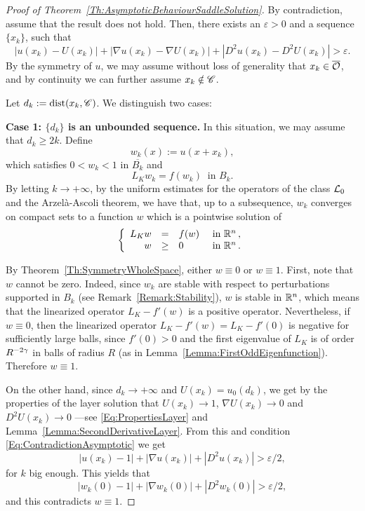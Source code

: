 \begin{proof}[Proof of Theorem~\ref{Th:AsymptoticBehaviourSaddleSolution}]
By contradiction, assume that the result does not hold. Then, there exists an $\varepsilon>0$ and a sequence $\{x_k\}$, such that
\begin{equation}
\label{Eq:ContradictionAsymptotic}
|u(x_k)-U(x_k)|+|\nabla u(x_k)-\nabla U(x_k)|+|D^2u(x_k)-D^2U(x_k)| > \varepsilon.
\end{equation}
By the symmetry of $u$, we may assume without loss of generality that $x_k \in \overline{\mathcal{O}}$, and by continuity we can further assume $ x_k \notin \mathscr{C}$. 

Let $d_k:=\operatorname{dist}(x_k,\mathscr{C})$. We distinguish two cases:

\textbf{Case 1: $\{d_k\}$ is an unbounded sequence.} In this situation, we may assume that $d_k \geq 2k$. Define
$$
w_k(x) := u(x+x_k), 
$$
which satisfies $0<w_k<1$ in $\overline{B_k}$ and
$$
L_K w_k = f(w_k) \ \textrm{ in } B_k.
$$
By letting $k\to +\infty$, by the uniform estimates for the operators of the class $\mathcal{L}_0$ and the Arzelà-Ascoli theorem, we have that, up to a subsequence, $w_k$ converges on compact sets to a function $w$ which is a pointwise solution of
$$
\left\{\begin{array}{rcll}
L_K  w &=& f(w) & \textrm{ in }\mathbb{R}^n\,,\\
w &\geq& 0 & \textrm{ in } \mathbb{R}^n\,.
\end{array} \right.
$$

By Theorem~\ref{Th:SymmetryWholeSpace}, either $w\equiv 0$ or $w\equiv 1$. First, note that $w$ cannot be zero. Indeed, since $w_k$ are stable with respect to perturbations supported in $B_k$ (see Remark~\ref{Remark:Stability}), $w$ is stable in $\mathbb{R}^n$, which means that the linearized operator $L_K-f'(w)$ is a positive operator. Nevertheless, if $w\equiv 0$, then the linearized operator $L_K-f'(w) = L_K-f'(0)$ is negative for sufficiently large balls, since $f'(0)>0$ and the first eigenvalue of $L_K$ is of order $R^{-2\gamma}$ in balls of radius $R$ (as in Lemma~\ref{Lemma:FirstOddEigenfunction}). Therefore $w\equiv 1$. 

On the other hand, since $d_k\rightarrow +\infty$ and $U(x_k) =  u_0(d_k)$, we get by the properties of the layer solution that $U(x_k) \rightarrow 1$, $\nabla U(x_k) \rightarrow 0$ and $D^2U(x_k) \rightarrow 0$ ---see \eqref{Eq:PropertiesLayer} and Lemma~\ref{Lemma:SecondDerivativeLayer}. From this and condition \eqref{Eq:ContradictionAsymptotic} we get
$$
|u(x_k)-1|+|\nabla u(x_k)|+|D^2u(x_k)| > \varepsilon/2,
$$
for $k$ big enough. This yields that 
$$
|w_k(0)-1|+|\nabla w_k(0)|+|D^2w_k(0)| > \varepsilon/2,
$$
and this contradicts $w \equiv 1$. 


\end{proof}
